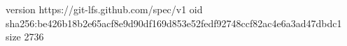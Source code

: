 version https://git-lfs.github.com/spec/v1
oid sha256:be426b18b2e65acf8e9d90df169d853e52fedf92748ccf82ac4e6a3ad47dbdc1
size 2736
